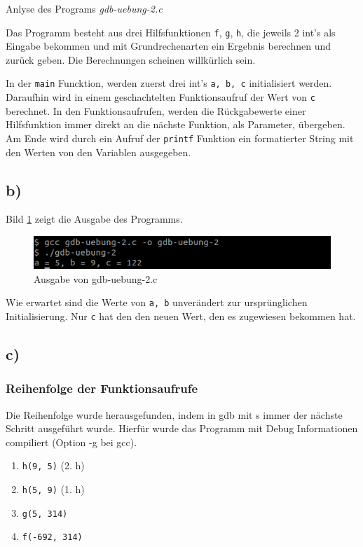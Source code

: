 \documentclass[12pt]{article}
\begin{document}
{Anlyse des Programs \textit{gdb-uebung-2.c}



Das Programm besteht aus drei Hilfsfunktionen \texttt{f}, \texttt{g}, \texttt{h}, die jeweils 2 int's als Eingabe bekommen und mit Grundrechenarten ein Ergebnis berechnen und zurück geben. Die Berechnungen scheinen willkürlich sein. 

In der \texttt{main} Funcktion, werden zuerst drei int's \texttt{a, b, c} initialisiert werden. Daraufhin wird in einem geschachtelten Funktionsaufruf der Wert von \texttt{c} berechnet. In den Funktionsaufrufen, werden die Rückgabewerte einer Hilfsfunktion immer direkt an die nächste Funktion, als Parameter, übergeben. Am Ende wird durch ein Aufruf der \texttt{printf} Funktion ein formatierter String mit den Werten von den Variablen ausgegeben.


\subsection{b)}

Bild \ref{fig:aufgabe2b} zeigt die Ausgabe des Programms.
\begin{figure}[h!]
	\includegraphics[width=\textwidth]{Pictures/a2b.png}
	\caption{Ausgabe von gdb-uebung-2.c}
	\label{fig:aufgabe2b}
\end{figure}


Wie erwartet sind die Werte von \texttt{a, b} unverändert zur ursprünglichen Initialisierung. Nur \texttt{c} hat den den neuen Wert, den es zugewiesen bekommen hat.

\subsection{c)}

\subsubsection{Reihenfolge der Funktionsaufrufe}

Die Reihenfolge wurde herausgefunden, indem in gdb mit s immer der nächste Schritt ausgeführt wurde. Hierfür wurde das Programm mit Debug Informationen compiliert (Option -g bei gcc).


\begin{enumerate}
\item \texttt{h(9, 5)} (2. h)
\item \texttt{h(5, 9)} (1. h)
\item \texttt{g(5, 314)}
\item \texttt{f(-692, 314)}
\end{enumerate}

}
\end{document}
